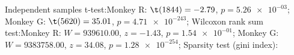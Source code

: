 Independent samples t-test:Monkey R: $\t(1844) = -2.79$, $p = \num{5.26e-03}$; 
Monkey G: $\t(5620) = 35.01$, $p = \num{4.71e-243}$; 
Wilcoxon rank sum test:Monkey R: $W = 939610.00$, $z = -1.43$, $p = \num{1.54e-01}$; 
Monkey G: $W = 9383758.00$, $z = 34.08$, $p = \num{1.28e-254}$; 
Sparsity test (gini index):